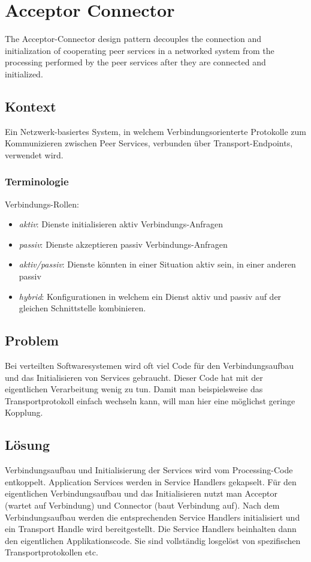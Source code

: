 \section{Acceptor Connector}
\label{sec:acceptor-connector}

The Acceptor-Connector design pattern decouples the connection and initialization of cooperating peer services in a networked system from the processing performed by the peer services after they are connected and initialized.

\subsection{Kontext}
Ein Netzwerk-basiertes System, in welchem Verbindungsorienterte Protokolle zum Kommunizieren zwischen Peer Services, verbunden über Transport-Endpoints, verwendet wird.

\subsubsection*{Terminologie}
Verbindungs-Rollen:
\begin{itemize}
	\item \emph{aktiv}: Dienste initialisieren aktiv Verbindungs-Anfragen
	\item \emph{passiv}: Dienste akzeptieren passiv Verbindungs-Anfragen
	\item \emph{aktiv/passiv}: Dienste könnten in einer Situation aktiv sein, in einer anderen passiv
	\item \emph{hybrid}: Konfigurationen in welchem ein Dienst aktiv und passiv auf der gleichen Schnittstelle kombinieren.
\end{itemize}


\subsection{Problem}
Bei verteilten Softwaresystemen wird oft viel Code für den Verbindungsaufbau und das Initialisieren von Services gebraucht. Dieser Code hat mit der eigentlichen Verarbeitung wenig zu tun. Damit man beispielsweise das Transportprotokoll einfach wechseln kann, will man hier eine möglichst geringe Kopplung.

\subsection{Lösung}
Verbindungsaufbau und Initialisierung der Services wird vom Processing-Code entkoppelt. Application Services werden in Service Handlers gekapselt. Für den eigentlichen Verbindungsaufbau und das Initialisieren nutzt man Acceptor (wartet auf Verbindung) und Connector (baut Verbindung auf).
Nach dem Verbindungsaufbau werden die entsprechenden Service Handlers initialisiert und ein Transport Handle wird bereitgestellt. Die Service Handlers beinhalten dann den eigentlichen Applikationscode. Sie sind vollständig losgelöst von spezifischen Transportprotokollen etc.



